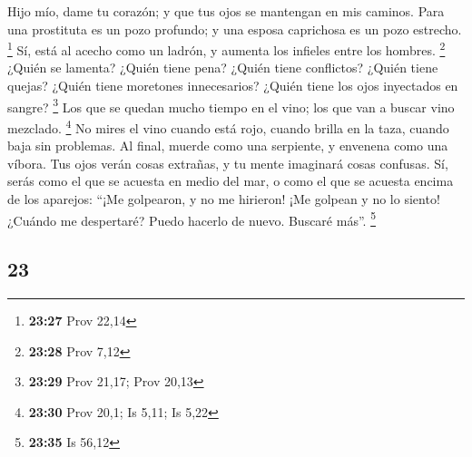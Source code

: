 \begin{paracol}{2}
Hijo mío, dame tu corazón; y que tus ojos se mantengan en mis caminos.
 Para una prostituta es un pozo profundo; y una esposa
caprichosa es un pozo estrecho. \footnote{\textbf{23:27} Prov 22,14}
 Sí, está al acecho como un ladrón, y aumenta los
infieles entre los hombres. \footnote{\textbf{23:28} Prov 7,12}
 ¿Quién se lamenta? ¿Quién tiene pena? ¿Quién tiene
conflictos? ¿Quién tiene quejas? ¿Quién tiene moretones innecesarios?
¿Quién tiene los ojos inyectados en sangre? \footnote{\textbf{23:29}
  Prov 21,17; Prov 20,13}  Los que se quedan mucho tiempo
en el vino; los que van a buscar vino mezclado. \footnote{\textbf{23:30}
  Prov 20,1; Is 5,11; Is 5,22}  No mires el vino cuando
está rojo, cuando brilla en la taza, cuando baja sin problemas.
 Al final, muerde como una serpiente, y envenena como una
víbora.  Tus ojos verán cosas extrañas, y tu mente
imaginará cosas confusas.  Sí, serás como el que se
acuesta en medio del mar, o como el que se acuesta encima de los
aparejos:  ``¡Me golpearon, y no me hirieron! ¡Me golpean
y no lo siento! ¿Cuándo me despertaré? Puedo hacerlo de nuevo. Buscaré
más''. \footnote{\textbf{23:35} Is 56,12}

\switchcolumn
\begin{otherlanguage}{english}

\hypertarget{section-45}{%
\section{23}\label{section-45}}


\end{otherlanguage}
\end{paracol}
